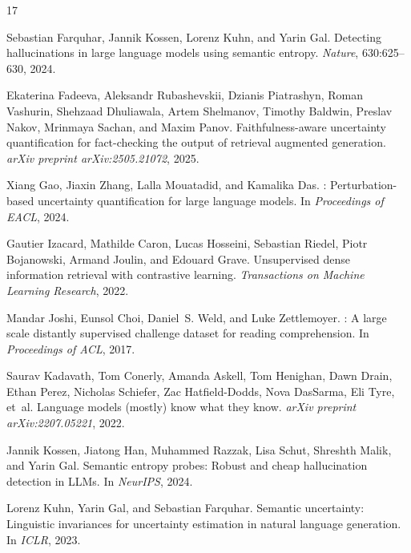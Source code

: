 \documentclass{article}
\begin{document}
\begin{thebibliography}{17}

Sebastian Farquhar, Jannik Kossen, Lorenz Kuhn, and Yarin Gal.
\newblock Detecting hallucinations in large language models using semantic entropy.
\newblock \emph{Nature}, 630:625--630, 2024.

Ekaterina Fadeeva, Aleksandr Rubashevskii, Dzianis Piatrashyn, Roman Vashurin, Shehzaad Dhuliawala, Artem Shelmanov, Timothy Baldwin, Preslav Nakov, Mrinmaya Sachan, and Maxim Panov.
\newblock Faithfulness-aware uncertainty quantification for fact-checking the output of retrieval augmented generation.
\newblock \emph{arXiv preprint arXiv:2505.21072}, 2025.

Xiang Gao, Jiaxin Zhang, Lalla Mouatadid, and Kamalika Das.
: Perturbation-based uncertainty quantification for large language models.
\newblock In \emph{Proceedings of EACL}, 2024.

Gautier Izacard, Mathilde Caron, Lucas Hosseini, Sebastian Riedel, Piotr Bojanowski, Armand Joulin, and Edouard Grave.
\newblock Unsupervised dense information retrieval with contrastive learning.
\newblock \emph{Transactions on Machine Learning Research}, 2022.

Mandar Joshi, Eunsol Choi, Daniel~S. Weld, and Luke Zettlemoyer.
: A large scale distantly supervised challenge dataset for reading comprehension.
\newblock In \emph{Proceedings of ACL}, 2017.

Saurav Kadavath, Tom Conerly, Amanda Askell, Tom Henighan, Dawn Drain, Ethan Perez, Nicholas Schiefer, Zac Hatfield-Dodds, Nova DasSarma, Eli Tyre, et~al.
\newblock Language models (mostly) know what they know.
\newblock \emph{arXiv preprint arXiv:2207.05221}, 2022.

Jannik Kossen, Jiatong Han, Muhammed Razzak, Lisa Schut, Shreshth Malik, and Yarin Gal.
\newblock Semantic entropy probes: Robust and cheap hallucination detection in {LLMs}.
\newblock In \emph{NeurIPS}, 2024.

Lorenz Kuhn, Yarin Gal, and Sebastian Farquhar.
\newblock Semantic uncertainty: Linguistic invariances for uncertainty estimation in natural language generation.
\newblock In \emph{ICLR}, 2023.


\end{thebibliography}
\end{document}
